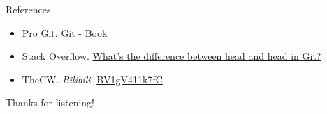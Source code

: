 \documentclass[aspectratio=169]{beamer}
\begin{document}
\begin{frame}{References}
    \begin{itemize}
        \item Pro Git. \href{https://git-scm.com/book/en/v2}{Git - Book}
        \item Stack Overflow. \href{https://stackoverflow.com/questions/2221658/whats-the-difference-between-head-and-head-in-git}{What's the difference between head and head in Git?}
        \item TheCW. \emph{Bilibili}. \href{https://www.bilibili.com/video/BV1gV411k7fC}{BV1gV411k7fC}
    \end{itemize}
\end{frame}

\begin{frame}
    \Huge{\textcolor{UMBlue}{Thanks for listening!}}
\end{frame}
\end{document}
